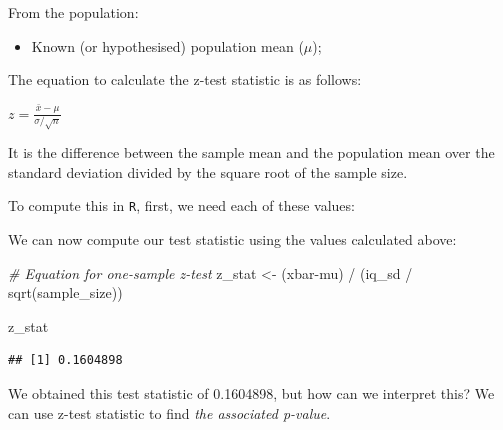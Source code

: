 \documentclass[
]{book}
\newenvironment{Shaded}{\begin{snugshade}}{\end{snugshade}}
\newcommand{\CommentTok}[1]{\textcolor[rgb]{0.56,0.35,0.01}{\textit{#1}}}
\newcommand{\DecValTok}[1]{\textcolor[rgb]{0.00,0.00,0.81}{#1}}
\newcommand{\FunctionTok}[1]{\textcolor[rgb]{0.00,0.00,0.00}{#1}}
\newcommand{\NormalTok}[1]{#1}
\newcommand{\OtherTok}[1]{\textcolor[rgb]{0.56,0.35,0.01}{#1}}
\newcommand{\SpecialCharTok}[1]{\textcolor[rgb]{0.00,0.00,0.00}{#1}}
\providecommand{\tightlist}{%
  \setlength{\itemsep}{0pt}\setlength{\parskip}{0pt}}
\begin{document}
From the population:

\begin{itemize}
\tightlist
\item
  Known (or hypothesised) population mean (\(\mu\));
\end{itemize}

The equation to calculate the z-test statistic is as follows:

\(z = \frac{\bar{x}-\mu}{\sigma/\sqrt{n}}\)

It is the difference between the sample mean and the population mean over the standard deviation divided by the square root of the sample size.

To compute this in \texttt{R}, first, we need each of these values:

\begin{Shaded}
\end{Shaded}

We can now compute our test statistic using the values calculated above:

\begin{Shaded}
\begin{Highlighting}[]
\CommentTok{\# Equation for one{-}sample z{-}test}
\NormalTok{z\_stat }\OtherTok{\textless{}{-}}\NormalTok{ (xbar}\SpecialCharTok{{-}}\NormalTok{mu) }\SpecialCharTok{/}\NormalTok{ (iq\_sd }\SpecialCharTok{/} \FunctionTok{sqrt}\NormalTok{(sample\_size)) }

\NormalTok{z\_stat}
\end{Highlighting}
\end{Shaded}

\begin{verbatim}
## [1] 0.1604898
\end{verbatim}

We obtained this test statistic of 0.1604898, but how can we interpret this? We can use z-test statistic to find \emph{the associated p-value}.
\end{document}
